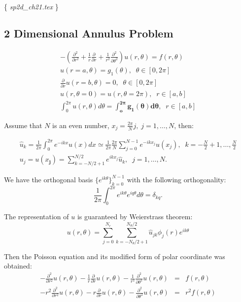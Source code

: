 

\{ {\it  sp2d\_ch21.tex} \}

\subsection{2 Dimensional Annulus Problem}

\begin{eqnarray}
- \left(\frac{\partial^2}{\partial r^2} + \frac{1}{r} \frac{\partial}{\partial r} + \frac{1}{r^2}\frac{\partial^2}{\partial \theta^2} \right) u(r,\theta) = f(r,\theta) \\
u(r=a,\theta) = g_1(\theta), \;\; \theta \in [0,2\pi] \\
\frac{\partial}{\partial r} u(r=b,\theta) = 0, \;\; \theta \in [0,2\pi] \\
u(r,\theta=0) = u(r,\theta=2\pi), \;\; r\in[a,b] \\
\int_0^{2\pi} u(r,\theta) d\theta = \mathbf{\int_o^{2\pi} g_1(\theta) d\theta}, \;\; r\in[a,b]
\end{eqnarray}



Assume that $N$ is an even number, $x_j = \frac{2\pi}{N}j, \; j=1,\ldots,N$, then:

\begin{eqnarray}
\hat{u}_k = \frac{1}{2\pi} \int_0^{2\pi}  e^{-ikx} u(x) dx  \simeq \frac{1}{2\pi}\frac{2\pi}{N} \sum_{j=0}^{N-1} e^{-ikx_j} u(x_j),  \;\; k=-\frac{N}{2}+1,\ldots,\frac{N}{2}\\
u_j = u(x_\mathbf{j}) = \sum_{k=-N/2+1}^{N/2} e^{ikx_j}\hat{u}_k, \;\; j=1,\ldots,N.
\end{eqnarray}

We have the orthogonal basis $\{e^{ik\theta}\}_{k = 0}^{N-1}$ with the following orthogonality:
\begin{equation}
\frac{1}{2\pi} \int_{0}^{2\pi} e^{ik\theta} e^{iq\theta} d\theta = \delta_{kq}.
\end{equation}



The representation of $u$ is guaranteed by Weierstrass theorem:
\begin{equation}
u(r,\theta) = \sum_{j=0}^{N_r} \sum_{k=-N_\theta/2+1}^{N_\theta/2} \hat{u}_{jk} \phi_j(r) e^{ik\theta}
\end{equation}

Then the Poisson equation and its modified form of polar coordinate was obtained:
\begin{eqnarray}
- \frac{\partial^2}{\partial r^2}u(r,\theta) - \frac{1}{r} \frac{\partial}{\partial r} u(r,\theta) - \frac{1}{r^2}\frac{\partial^2}{\partial \theta^2} u(r,\theta) &=& f(r,\theta) \\
- r^2 \frac{\partial^2}{\partial r^2} u(r,\theta) - r \frac{\partial}{\partial r} u(r,\theta) - \frac{\partial^2}{\partial \theta^2} u(r,\theta) &=& r^2 f(r,\theta)
\end{eqnarray}


